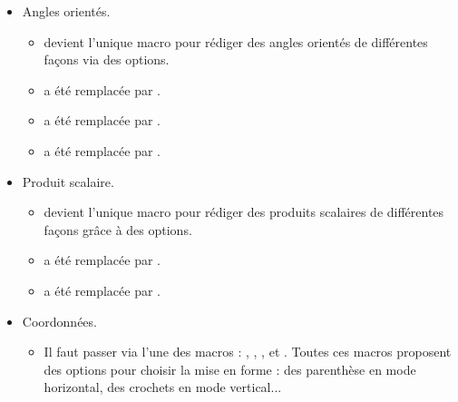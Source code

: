 \documentclass[12pt,a4paper]{article}
\begin{document}
\begin{description}
\begin{itemize}[itemsep=.5em]
\begin{itemize}[itemsep=.5em]
            \item Angles orientés.
            
            \begin{itemize}[itemsep=.5em, label=$\rightarrow$]
                \item {} devient l'unique macro pour rédiger des angles orientés de différentes façons via des options.
                
                \item {}  a été remplacée par .
                
                \item {}  a été remplacée par .
                      
                \item {} a été remplacée par .
    	    \end{itemize}
    
    
            \item Produit scalaire.
            
            \begin{itemize}[itemsep=.5em, label=$\rightarrow$]
                \item {} devient l'unique macro pour rédiger des produits scalaires de différentes façons grâce à des options.
                
                \item {}  a été remplacée par .
    
                \item {} a été remplacée par .
    	    \end{itemize}
    
    
            \item Coordonnées.
            
            \begin{itemize}[itemsep=.5em, label=$\rightarrow$]
                \item Il faut passer via l'une des macros : , , ,  et .
                      Toutes ces macros proposent des options pour choisir la mise en forme : des parenthèse en mode horizontal, des crochets en mode vertical...
    

\end{itemize}
\end{itemize}
\end{itemize}
\end{description}
\end{document}
